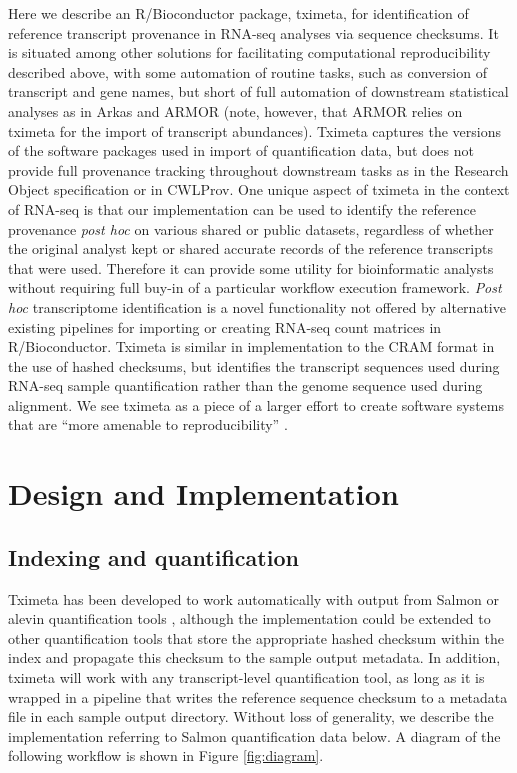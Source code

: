 \documentclass[10pt,letterpaper]{article}
\begin{document}
Here we describe an R/Bioconductor package, tximeta, for
identification of reference transcript provenance in RNA-seq analyses
via sequence checksums. It is situated among other solutions for
facilitating computational reproducibility described above, with some
automation of routine tasks, such as conversion of transcript and gene
names, but short of full automation of downstream statistical analyses
as in Arkas and ARMOR (note, however, that ARMOR relies on tximeta 
for the import of transcript abundances). Tximeta captures the versions of the software
packages used in import of quantification data, but does not provide
full provenance tracking throughout downstream tasks as in the
Research Object specification or in CWLProv. One unique aspect of
tximeta in the context of RNA-seq is that our implementation can be
used to identify the reference provenance
\textit{post hoc} on various shared or public datasets, regardless of
whether the original analyst kept or shared accurate records of the
reference transcripts that were used. Therefore it can provide some
utility for bioinformatic analysts without requiring full buy-in of a
particular workflow execution framework.
\textit{Post hoc} transcriptome identification is a novel
functionality not offered by alternative existing pipelines for
importing or creating RNA-seq count matrices in R/Bioconductor.
Tximeta is similar in implementation to the CRAM format in the use of
hashed checksums, but identifies the transcript sequences used during
RNA-seq sample quantification rather than the genome sequence
used during alignment. We see tximeta as a piece of a larger effort to
create software systems that are ``more amenable to reproducibility''
\cite{Peng2011}.

\section*{Design and Implementation}

\subsection*{Indexing and quantification}

Tximeta has been developed to work automatically with output from
Salmon or alevin quantification tools \cite{salmon,alevin},
although the implementation could be extended to other quantification
tools that store the appropriate hashed checksum within the index and
propagate this checksum to the sample output metadata.
In addition, tximeta will work with any transcript-level
quantification tool, as long as it is wrapped in a pipeline that
writes the reference sequence checksum to a metadata file in each
sample output directory. Without loss of generality, we
describe the implementation referring to Salmon quantification data
below. A diagram of the following workflow is shown in Figure
\ref{fig:diagram}. 
\end{document}
